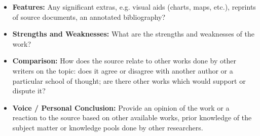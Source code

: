 {{\begin{itemize}
    \item \textbf{Features:} Any significant extras, e.g. visual aids (charts, maps, etc.), reprints of source documents, an annotated bibliography?
    \item \textbf{Strengths and Weaknesses:} What are the strengths and weaknesses of the work?
    \item \textbf{Comparison:} How does the source relate to other works done by other writers on the topic: does it agree or disagree with another author or a particular school of thought; are there other works which would support or dispute it?
    \item \textbf{Voice / Personal Conclusion:} Provide an opinion of the work or a reaction to the source based on other available works, prior knowledge of the subject matter or knowledge pools done by other researchers.
    \end{itemize}
    }
}
